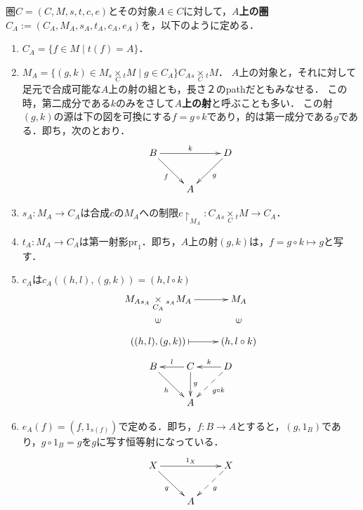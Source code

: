 \documentclass[uplatex, dvipdfmx]{jsreport}
\begin{document}
\begin{definition}
    圏$C=(C,M,s,t,c,e)$とその対象$A\in C$に対して，\textbf{$A$上の圏}$C_A:=(C_A, M_A, s_A, t_A, c_A, e_A)$を，以下のように定める．
    \begin{enumerate}
        \item $C_A=\{ f\in M\mid t(f)=A \}$．
        \item  $M_A=\{(g,k)\in M_s\underset{C}{\times}{}_tM\mid g\in C_A\}C_A{}_s\underset{C}{\times}{}_tM$．
        $A$上の対象と，それに対して足元で合成可能な$A$上の射の組とも，長さ２のpathだともみなせる．
        この時，第二成分である$k$のみをさして\textbf{$A$上の射}と呼ぶことも多い．
        この射$(g,k)$の源は下の図を可換にする$f=g\circ k$であり，的は第一成分である$g$である．即ち，次のとおり．
        \[\xymatrix{
            B\ar[rr]^-k\ar[dr]_-f&&D\ar[dl]^-g\\
            &A&
        }\]
        \item $s_A:M_A\to C_A$は合成$c$の$M_A$への制限$c\restriction_{M_A}:C_A{}_s\underset{C}{\times}{}_tM\to C_A$．
        \item $t_A:M_A\to C_A$は第一射影$\mathrm{pr}_1$．即ち，$A$上の射$(g,k)$は，$f=g\circ k\mapsto g$と写す．
        \item $c_A$は$c_A((h,l),(g,k))=(h, l\circ k)$
        \[\xymatrix{
            M_A{}_{s_A}\underset{C_A}{\times}{}_{s_A}M_A\ar[r]\ar@{}[d]|{\rotatebox{90}{$\in$}}&M_A\ar@{}[d]|{\rotatebox{90}{$\in$}}\\
            {\left( (h,l),(g,k) \right)}\ar@{|->}[r]&{(h,l\circ k)}
        }\]
        \[\xymatrix{
            B\ar[dr]_-h&C\ar[l]_-l\ar[d]^-g&D\ar[l]_-k\ar@{-->}[dl]^-{g\circ k}\\
            &A&
        }\]
        \item $e_A(f)=(f,1_{s(f)})$で定める．即ち，$f:B\to A$とすると，$(g,1_B)$であり，$g\circ 1_B=g$を$g$に写す恒等射になっている．
        \[\xymatrix{
            X\ar[dr]_-g\ar[rr]^-{1_X}&&X\ar@{-->}[dl]^-g\\
            &A&
        }\]
    \end{enumerate}
\end{definition}
\end{document}
